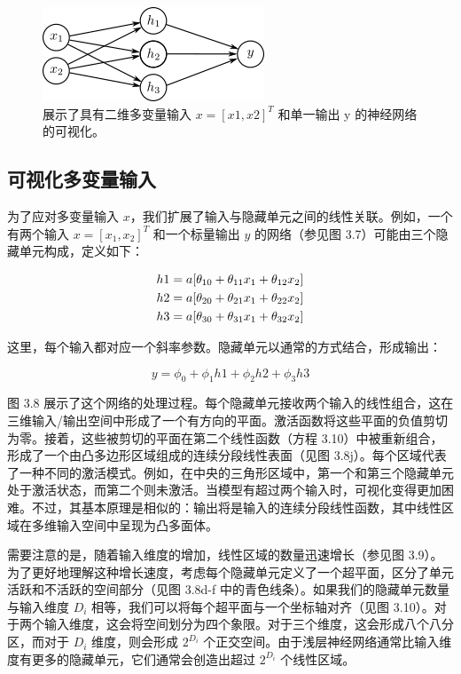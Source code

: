 \begin{figure}[ht!]
	\centering
	\includegraphics[width=0.7\linewidth]{png/chapter3/ShallowNetTwoInputs.png}
\caption{展示了具有二维多变量输入 $x = [x1, x2]^T$ 和单一输出 y 的神经网络的可视化。}
\end{figure}

\subsection{可视化多变量输入}

为了应对多变量输入 \(x\)，我们扩展了输入与隐藏单元之间的线性关联。例如，一个有两个输入 \(x = [x_1, x_2]^T\) 和一个标量输出 \(y\) 的网络（参见图 3.7）可能由三个隐藏单元构成，定义如下：


\begin{align}
	h1 = a[\theta_{10} + \theta_{11}x_1 + \theta_{12}x_2] \notag \\
	h2 = a[\theta_{20} + \theta_{21}x_1 + \theta_{22}x_2] \notag \\
	h3 = a[\theta_{30} + \theta_{31}x_1 + \theta_{32}x_2] 
\end{align} 



这里，每个输入都对应一个斜率参数。隐藏单元以通常的方式结合，形成输出：

\begin{equation}
y = \phi_0 + \phi_1h1 + \phi_2h2 + \phi_3h3 
\end{equation}


图 3.8 展示了这个网络的处理过程。每个隐藏单元接收两个输入的线性组合，这在三维输入/输出空间中形成了一个有方向的平面。激活函数将这些平面的负值剪切为零。接着，这些被剪切的平面在第二个线性函数（方程 3.10）中被重新组合，形成了一个由凸多边形区域组成的连续分段线性表面（见图 3.8j）。每个区域代表了一种不同的激活模式。例如，在中央的三角形区域中，第一个和第三个隐藏单元处于激活状态，而第二个则未激活。当模型有超过两个输入时，可视化变得更加困难。不过，其基本原理是相似的：输出将是输入的连续分段线性函数，其中线性区域在多维输入空间中呈现为凸多面体。

需要注意的是，随着输入维度的增加，线性区域的数量迅速增长（参见图 3.9）。为了更好地理解这种增长速度，考虑每个隐藏单元定义了一个超平面，区分了单元活跃和不活跃的空间部分（见图 3.8d-f 中的青色线条）。如果我们的隐藏单元数量与输入维度 \(D_i\) 相等，我们可以将每个超平面与一个坐标轴对齐（见图 3.10）。对于两个输入维度，这会将空间划分为四个象限。对于三个维度，这会形成八个八分区，而对于 \(D_i\) 维度，则会形成 \(2^{D_i}\) 个正交空间。由于浅层神经网络通常比输入维度有更多的隐藏单元，它们通常会创造出超过 \(2^{D_i}\) 个线性区域。

